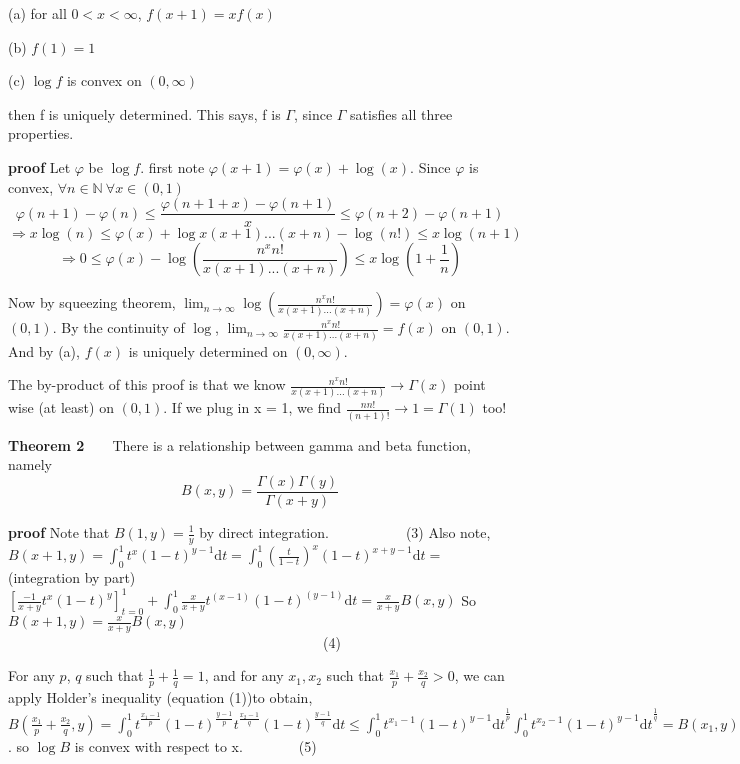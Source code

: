 \documentclass[a4paper,12pt]{article}
\begin{document}
(a) for all $0<x<\infty$, $f(x+1) = xf(x)$ 

(b) $f(1) = 1$

(c) $\log f$ is convex on $(0, \infty)$

then f is uniquely determined. This says, f is $\Gamma$, since $\Gamma$ satisfies all three properties. 

\textbf{proof} Let $\varphi$ be $\log f$. first note $\varphi(x+1) = \varphi(x) + \log(x)$. Since $\varphi$ is convex, 
$\forall n \in \mathbb{N}\ \forall x \in (0, 1)$ $$ \varphi(n+1)-\varphi(n) \leq\frac{\varphi(n+1+x)-\varphi(n+1)}{x} \leq\varphi(n+2) - \varphi(n+1) $$
$$\Rightarrow x \log(n) \leq \varphi(x) + \log x(x+1)...(x+n)-\log(n!) \leq x \log(n+1)$$
$$\Rightarrow 0 \leq \varphi(x) - \log( \frac{n^xn!}{x(x+1)...(x+n)}) \leq x \log( 1+\frac{1}{n} )$$

Now by squeezing theorem, $\lim_{n \to \infty}\log( \frac{n^xn!}{x(x+1)...(x+n)}) = \varphi(x)$ on $(0, 1)$.
By the continuity of $\log$,  $\lim_{n \to \infty}\frac{n^xn!}{x(x+1)...(x+n)} = f(x)$ on $(0, 1)$. And by (a), $f(x)$ is uniquely determined on $(0, \infty)$.

The by-product of this proof is that we know $\frac{n^xn!}{x(x+1)...(x+n)} \to \Gamma(x)$ point wise (at least) on $(0, 1)$. If we plug in x = 1, we find $\frac{n n!}{(n+1)!} \to 1 = \Gamma(1)$ too! 

\textbf{Theorem 2}\ \ \ \ There is a relationship between gamma and beta function, namely
$$B(x, y) = \frac{\Gamma(x)\Gamma(y)}{\Gamma(x+y)}$$

\textbf{proof} Note that $B(1, y) = \frac{1}{y}$ by direct integration.\ \ \ \ \ \ \ \ \ \ \ (3) 
Also note,  $B(x+1, y) = \int_0^1 t^{x}(1-t)^{y-1}\mathrm{d}t = \int_0^1 (\frac{t}{1-t})^{x}(1-t)^{x+y-1}\mathrm{d}t =$
 (integration by part)
$[\frac{-1}{x+y}t^x(1-t)^y]_{t=0}^1 + \int_0^1 \frac{x}{x+y}t^(x-1)(1-t)^(y-1) \mathrm{d}t = \frac{x}{x+y}B(x, y)$ 
So $B(x+1, y) = \frac{x}{x+y}B(x, y)$\ \ \ \ \ \ \ \ \ \ \ \ \ \ \ \ \ \ \ \ \ \ \ \ \ \ \ \ \ \ \ \ \ \ \ \ \ \ \ \ \ \ \ \ \ (4)

For any $p$, $q$ such that $\frac{1}{p} + \frac{1}{q} = 1$, and for any $x_1, x_2$ such that $\frac{x_1}{p} + \frac{x_2}{q}>0$, we can apply Holder's inequality (equation (1))to obtain, 
$B( \frac{x_1}{p} + \frac{x_2}{q}, y ) = \int_0^1 t^{\frac{x_1-1}{p}} (1-t)^{\frac{y-1}{p}} t^{\frac{x_2-1}{q}} (1-t)^{\frac{y-1}{q}}\mathrm{d}t
\leq {\int_0^1 t^{x_1-1} (1-t)^{y-1} \mathrm{d}t} ^ {\frac{1}{p}} {\int_0^1 t^{x_2-1} (1-t)^{y-1}\mathrm{d}t}^{\frac{1}{q}} = B(x_1, y)^{\frac{1}{p}}B(x_2, y)^{\frac{1}{q}}$. so $\log B$ is convex with respect to x.\ \ \ \ \ \ \ \ (5) 
\end{document}
